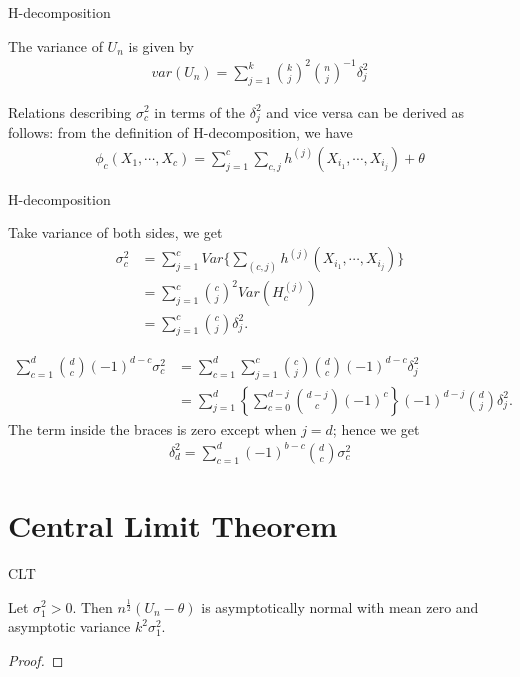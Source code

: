 \documentclass{beamer}
\theoremstyle{definition}
\numberwithin{Def}{section}
\begin{document}
    
\begin{frame}{H-decomposition}
    \begin{theorem}
    The variance of $U_n$ is given by 
    \begin{align}
        var(U_n) = \sum_{j=1}^k {k \choose j}^2 {n \choose j}^{-1}\delta_j^2
    \end{align}
    \end{theorem}
    Relations describing $\sigma_{c}^2$ in terms of the $\delta_j^2 $ and vice versa can be derived as follows: from the definition of H-decomposition, we have 
    \begin{align*}
        \phi_c (X_1, \cdots, X_c) = \sum_{j = 1}^c \sum_{c,j} h^{(j)} (X_{i_{1}}, \cdots , X_{i_j}) + \theta
    \end{align*}
    \end{frame}
    
    \begin{frame}{H-decomposition}
    \begin{fontsize}{7}{12}
    Take variance of both sides,  we get 
    \begin{align*}
        \sigma_{c}^2 &= \sum_{j = 1}^c Var\{ \sum_{(c, j)} h^{(j)} (X_{i_{1}}, \cdots , X_{i_j})\} \\
        &= \sum_{j = 1}^c {c \choose j}^2 Var( H_c^{(j)}) \\ 
        &= \sum_{j = 1}^c {c \choose j} \delta_j^2.
    \end{align*}

    \begin{align*}
        \sum_{c=1}^d {d \choose c} (-1)^{d-c} \sigma_{c}^2 &= \sum_{c=1}^d  
       \sum_{j = 1}^c {c \choose j}  {d \choose c} (-1)^{d-c} \delta_j^2 \\
       &= \sum_{j=1}^d \left\{ \sum_{c = 0}^{d - j} {d - j \choose c} (-1)^c \right\} (-1)^{d -j} {d \choose j} \delta_j^2.
    \end{align*}
    The term inside the braces is zero except when $j = d$; hence we get 
    \begin{align*}
        \delta_d^2 = \sum_{c = 1}^d (-1)^{b-c} {d \choose c} \sigma_{c}^2
    \end{align*}
    \end{fontsize}
    \end{frame}
    
    

\section{Central Limit Theorem}
\begin{frame}{CLT}
    \begin{theorem}
    Let $\sigma_1^{2} > 0$. Then $n^{\frac{1}{2}}(U_n - \theta)$ is asymptotically normal with mean zero and asymptotic variance $k^2 \sigma_1^2$.
    \end{theorem}
    
    \begin{proof}
    
    \end{proof}
\end{frame}
\end{document}
